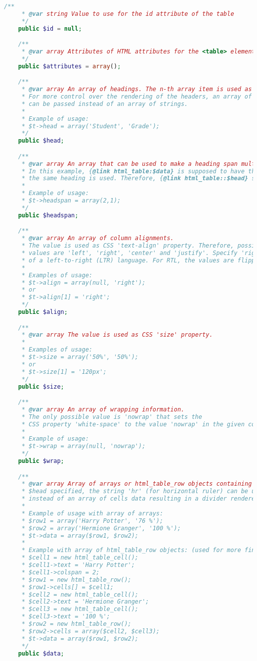 \begin{lstlisting}[language=PHP]
    /**
     * @var string Value to use for the id attribute of the table
     */
    public $id = null;

    /**
     * @var array Attributes of HTML attributes for the <table> element
     */
    public $attributes = array();

    /**
     * @var array An array of headings. The n-th array item is used as a heading of the n-th column.
     * For more control over the rendering of the headers, an array of html_table_cell objects
     * can be passed instead of an array of strings.
     *
     * Example of usage:
     * $t->head = array('Student', 'Grade');
     */
    public $head;

    /**
     * @var array An array that can be used to make a heading span multiple columns.
     * In this example, {@link html_table:$data} is supposed to have three columns. For the first two columns,
     * the same heading is used. Therefore, {@link html_table::$head} should consist of two items.
     *
     * Example of usage:
     * $t->headspan = array(2,1);
     */
    public $headspan;

    /**
     * @var array An array of column alignments.
     * The value is used as CSS 'text-align' property. Therefore, possible
     * values are 'left', 'right', 'center' and 'justify'. Specify 'right' or 'left' from the perspective
     * of a left-to-right (LTR) language. For RTL, the values are flipped automatically.
     *
     * Examples of usage:
     * $t->align = array(null, 'right');
     * or
     * $t->align[1] = 'right';
     */
    public $align;

    /**
     * @var array The value is used as CSS 'size' property.
     *
     * Examples of usage:
     * $t->size = array('50%', '50%');
     * or
     * $t->size[1] = '120px';
     */
    public $size;

    /**
     * @var array An array of wrapping information.
     * The only possible value is 'nowrap' that sets the
     * CSS property 'white-space' to the value 'nowrap' in the given column.
     *
     * Example of usage:
     * $t->wrap = array(null, 'nowrap');
     */
    public $wrap;

    /**
     * @var array Array of arrays or html_table_row objects containing the data. Alternatively, if you have
     * $head specified, the string 'hr' (for horizontal ruler) can be used
     * instead of an array of cells data resulting in a divider rendered.
     *
     * Example of usage with array of arrays:
     * $row1 = array('Harry Potter', '76 %');
     * $row2 = array('Hermione Granger', '100 %');
     * $t->data = array($row1, $row2);
     *
     * Example with array of html_table_row objects: (used for more fine-grained control)
     * $cell1 = new html_table_cell();
     * $cell1->text = 'Harry Potter';
     * $cell1->colspan = 2;
     * $row1 = new html_table_row();
     * $row1->cells[] = $cell1;
     * $cell2 = new html_table_cell();
     * $cell2->text = 'Hermione Granger';
     * $cell3 = new html_table_cell();
     * $cell3->text = '100 %';
     * $row2 = new html_table_row();
     * $row2->cells = array($cell2, $cell3);
     * $t->data = array($row1, $row2);
     */
    public $data;


\end{lstlisting}
